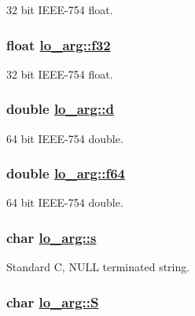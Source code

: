 32 bit IEEE-754 float. \hypertarget{unionlo__arg_27ae2540e5e98e85826ccb7350b2ab20}{
\subsubsection[f32]{\setlength{\rightskip}{0pt plus 5cm}float \hyperlink{unionlo__arg_27ae2540e5e98e85826ccb7350b2ab20}{lo\_\-arg::f32}}}
\label{unionlo__arg_27ae2540e5e98e85826ccb7350b2ab20}


32 bit IEEE-754 float. \hypertarget{unionlo__arg_2a690890222baa5b9971f8772cb02535}{
\subsubsection[d]{\setlength{\rightskip}{0pt plus 5cm}double \hyperlink{unionlo__arg_2a690890222baa5b9971f8772cb02535}{lo\_\-arg::d}}}
\label{unionlo__arg_2a690890222baa5b9971f8772cb02535}


64 bit IEEE-754 double. \hypertarget{unionlo__arg_bf90442900450bb63d8d9bb4e60af4ee}{
\subsubsection[f64]{\setlength{\rightskip}{0pt plus 5cm}double \hyperlink{unionlo__arg_bf90442900450bb63d8d9bb4e60af4ee}{lo\_\-arg::f64}}}
\label{unionlo__arg_bf90442900450bb63d8d9bb4e60af4ee}


64 bit IEEE-754 double. \hypertarget{unionlo__arg_15bbcf8284d75ad441b5cde7218548f6}{
\subsubsection[s]{\setlength{\rightskip}{0pt plus 5cm}char \hyperlink{unionlo__arg_15bbcf8284d75ad441b5cde7218548f6}{lo\_\-arg::s}}}
\label{unionlo__arg_15bbcf8284d75ad441b5cde7218548f6}


Standard C, NULL terminated string. \hypertarget{unionlo__arg_b9c6a9c09ea094d58f889ed1a5edba0b}{
\subsubsection[S]{\setlength{\rightskip}{0pt plus 5cm}char \hyperlink{unionlo__arg_b9c6a9c09ea094d58f889ed1a5edba0b}{lo\_\-arg::S}}}
\label{unionlo__arg_b9c6a9c09ea094d58f889ed1a5edba0b}


